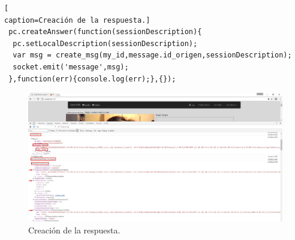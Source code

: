 \begin{lstlisting}[
caption=Creación de la respuesta.]
 pc.createAnswer(function(sessionDescription){
  pc.setLocalDescription(sessionDescription);
  var msg = create_msg(my_id,message.id_origen,sessionDescription);
  socket.emit('message',msg);
 },function(err){console.log(err);},{});
\end{lstlisting}
\begin{figure}[!h]
\centering
\includegraphics[width=0.8\linewidth]{Figures/AnswerCliente}
\decoRule
\caption[Creación de la respuesta.]{Creación de la respuesta.}
\label{fig:Conexcion_finish}
\end{figure}

